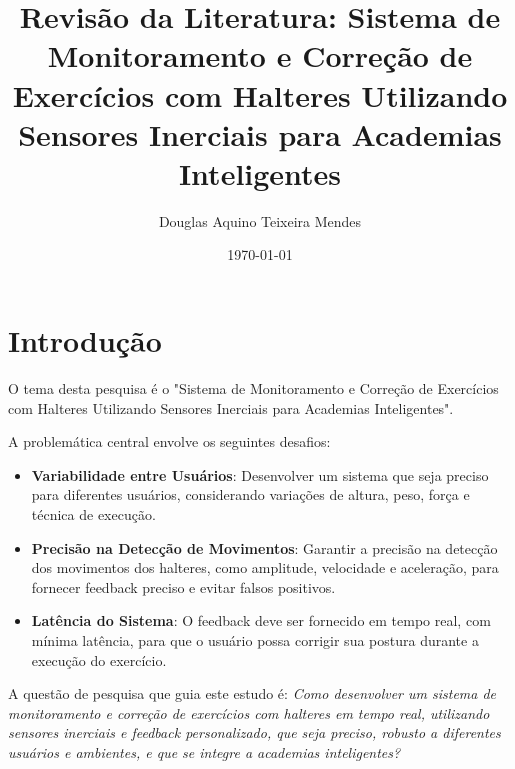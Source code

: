 \documentclass[a4paper,12pt]{article}
\title{Revisão da Literatura: Sistema de Monitoramento e Correção de Exercícios com Halteres Utilizando Sensores Inerciais para Academias Inteligentes}
\author{Douglas Aquino Teixeira Mendes}
\date{\today}
\begin{document}
\maketitle

\tableofcontents
\newpage

\section{Introdução}
O tema desta pesquisa é o "Sistema de Monitoramento e Correção de Exercícios com Halteres Utilizando Sensores Inerciais para Academias Inteligentes". 

A problemática central envolve os seguintes desafios:
\begin{itemize}
    \item \textbf{Variabilidade entre Usuários}: Desenvolver um sistema que seja preciso para diferentes usuários, considerando variações de altura, peso, força e técnica de execução.
    \item \textbf{Precisão na Detecção de Movimentos}: Garantir a precisão na detecção dos movimentos dos halteres, como amplitude, velocidade e aceleração, para fornecer feedback preciso e evitar falsos positivos.
    \item \textbf{Latência do Sistema}: O feedback deve ser fornecido em tempo real, com mínima latência, para que o usuário possa corrigir sua postura durante a execução do exercício.
\end{itemize}

A questão de pesquisa que guia este estudo é: \textit{Como desenvolver um sistema de monitoramento e correção de exercícios com halteres em tempo real, utilizando sensores inerciais e feedback personalizado, que seja preciso, robusto a diferentes usuários e ambientes, e que se integre a academias inteligentes?}
\end{document}
